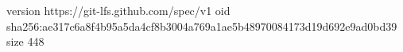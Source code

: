 version https://git-lfs.github.com/spec/v1
oid sha256:ae317c6a8f4b95a5da4cf8b3004a769a1ae5b48970084173d19d692e9ad0bd39
size 448
